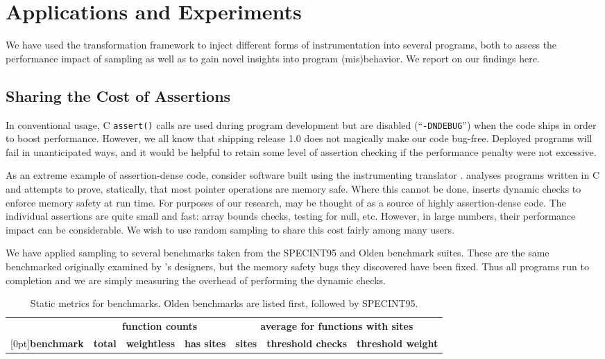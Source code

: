 \section{Applications and Experiments}
\label{sec:applications}

We have used the transformation framework to inject different forms of
instrumentation into several programs, both to assess the performance
impact of sampling as well as to gain novel insights into program
(mis)behavior.  We report on our findings here.

\subsection{Sharing the Cost of Assertions}

In conventional usage, C \texttt{assert()} calls are used during
program development but are disabled (``\texttt{-DNDEBUG}'') when the
code ships in order to boost performance.  However, we all know that
shipping release 1.0 does not magically make our code bug-free.
Deployed programs will fail in unanticipated ways, and it would be
helpful to retain some level of assertion checking if the performance
penalty were not excessive.

As an extreme example of assertion-dense code, consider software built
using the \ccured instrumenting translator \cite{POPL_'02*128}.
\ccured analyses programs written in C and attempts to prove,
statically, that most pointer operations are memory safe.  Where this
cannot be done, \ccured inserts dynamic checks to enforce memory
safety at run time.  For purposes of our research, \ccured may be
thought of as a source of highly assertion-dense code.  The individual
assertions are quite small and fast: array bounds checks, testing for
null, etc.  However, in large numbers, their performance impact can be
considerable.  We wish to use random sampling to share this cost
fairly among many users.

We have applied sampling to several benchmarks taken from the
SPECINT95 \cite{SPEC95} and Olden \cite{Carlisle:1996:OPPWDDSDMM}
benchmark suites.  These are the same benchmarked originally examined
by \ccured's designers, but the memory safety bugs they discovered
have been fixed.  Thus all programs run to completion and we are
simply measuring the overhead of performing the dynamic checks.

\begin{table*}[tb]
  \centering
  \begin{tabular}{|l|rrr|rrr|}
    \hline
    & \multicolumn{3}{c|}{\textbf{function counts}} & \multicolumn{3}{c|}{\textbf{average for functions with sites}} \\
    \raisebox{1.5ex}[0pt]{\textbf{benchmark}} & \textbf{total} & \textbf{weightless} & \textbf{has sites} & \textbf{sites} & \textbf{threshold checks} & \textbf{threshold weight} \\
    \hline\hline
    
    \hline
    
    \hline
  \end{tabular}
  \caption{Static metrics for \ccured benchmarks.  Olden benchmarks
    are listed first, followed by SPECINT95.}
  \label{tab:ccured-static}
\end{table*}

